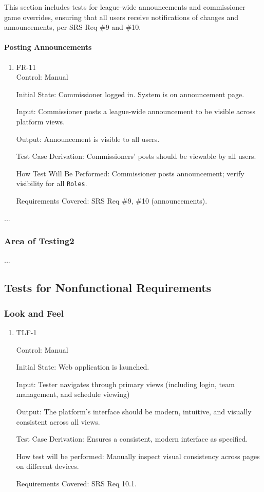 \documentclass[12pt, titlepage]{article}
\begin{document}
This section includes tests for league-wide announcements and commissioner game overrides, ensuring that all users receive notifications of changes and announcements, per SRS Req \#9 and \#10.

\paragraph{Posting Announcements}

\begin{enumerate}

\item{FR-11\\}
Control: Manual

Initial State: Commissioner logged in. System is on announcement page.

Input: Commissioner posts a league-wide announcement to be visible across platform views.

Output: Announcement is visible to all users.

Test Case Derivation: Commissioners' posts should be viewable by all users.

How Test Will Be Performed: Commissioner posts announcement; verify visibility for all \texttt{Roles}.

Requirements Covered: SRS Req \#9, \#10 (announcements).
\end{enumerate}

...

\subsubsection{Area of Testing2}

...

\subsection{Tests for Nonfunctional Requirements}

\subsubsection{Look and Feel}
		
\begin{enumerate}

\item{TLF-1\\}

Control: Manual
					
Initial State: Web application is launched.
					
Input: Tester navigates through primary views (including login, team management, and schedule viewing)
					
Output: The platform’s interface should be modern, intuitive, and visually consistent across all views.

Test Case Derivation: Ensures a consistent, modern interface as specified.
					
How test will be performed: Manually inspect visual consistency across pages on different devices.

Requirements Covered: SRS Req 10.1.

\end{enumerate}
\end{document}
